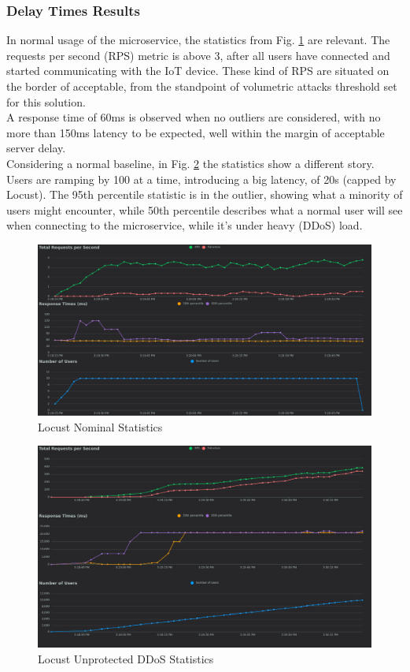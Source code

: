\documentclass[conference]{IEEEtran}
\begin{document}
\subsubsection*{Delay Times Results}
In normal usage of the microservice, the statistics from Fig. \ref{fig:nominal-statistics} are relevant. The requests per second (RPS) metric is above 3, after all users have connected and started communicating with the IoT device. These kind of RPS are situated on the border of acceptable, from the standpoint of volumetric attacks threshold set for this solution.
\\
A response time of 60ms is observed when no outliers are considered, with no more than 150ms latency to be expected, well within the margin of acceptable server delay.
\\
Considering a normal baseline, in Fig. \ref{fig:ddos-statistics} the statistics show a different story. Users are ramping by 100 at a time, introducing a big latency, of 20s (capped by Locust). The 95th percentile statistic is in the outlier, showing what a minority of users might encounter, while 50th percentile describes what a normal user will see when connecting to the microservice, while it's under heavy (DDoS) load. 

\begin{figure}
    \centering
    \includegraphics[width=1\linewidth]{images/nominal_usage.png}
    \caption{Locust Nominal Statistics}
    \label{fig:nominal-statistics}
\end{figure}

\begin{figure}
    \centering
    \includegraphics[width=1\linewidth]{images/ddos_usage.png}
    \caption{Locust Unprotected DDoS Statistics}
    \label{fig:ddos-statistics}
\end{figure}
\end{document}
